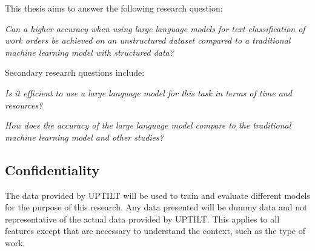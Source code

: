 This thesis aims to answer the following research question:

\bigskip
\textit{Can a higher accuracy when using large language models for
    text classification of work orders be achieved on an unstructured dataset
    compared to a traditional machine learning model with structured data?}

\bigskip
\noindent
Secondary research questions include:

\bigskip
\textit{Is it efficient to use a large language model for this task in terms of
    time and resources?}

\bigskip
\textit{How does the accuracy of the large language model compare to the
    traditional machine learning model and other studies?}

\subsection{Confidentiality}

The data provided by UPTILT will be used to train and evaluate different models
for the purpose of this research. Any data presented will be dummy data and not
representative of the actual data provided by UPTILT. This applies to all
features except that are necessary to understand the context, such as the type
of work.
